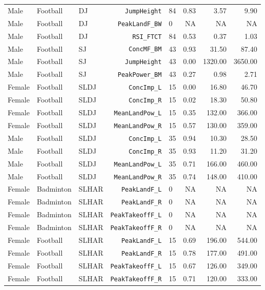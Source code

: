{\begin{longtable}{lllrlrrr}
Male & Football & DJ & \texttt{JumpHeight} & 84 & 0.83 & 3.57 & 9.90 \\
Male & Football & DJ & \texttt{PeakLandF\_BW} & 0 & NA & NA & NA \\
Male & Football & DJ & \texttt{RSI\_FTCT} & 84 & 0.53 & 0.37 & 1.03 \\
\addlinespace[1pt]
Male & Football & SJ & \texttt{ConcMF\_BM} & 43 & 0.93 & 31.50 & 87.40 \\
Male & Football & SJ & \texttt{JumpHeight} & 43 & 0.00 & 1320.00 & 3650.00 \\
Male & Football & SJ & \texttt{PeakPower\_BM} & 43 & 0.27 & 0.98 & 2.71 \\
\addlinespace[1pt]
Female & Football & SLDJ & \texttt{ConcImp\_L} & 15 & 0.00 & 16.80 & 46.70 \\
Female & Football & SLDJ & \texttt{ConcImp\_R} & 15 & 0.02 & 18.30 & 50.80 \\
Female & Football & SLDJ & \texttt{MeanLandPow\_L} & 15 & 0.35 & 132.00 & 366.00 \\
Female & Football & SLDJ & \texttt{MeanLandPow\_R} & 15 & 0.57 & 130.00 & 359.00 \\
Male & Football & SLDJ & \texttt{ConcImp\_L} & 35 & 0.94 & 10.30 & 28.50 \\
Male & Football & SLDJ & \texttt{ConcImp\_R} & 35 & 0.93 & 11.20 & 31.20 \\
Male & Football & SLDJ & \texttt{MeanLandPow\_L} & 35 & 0.71 & 166.00 & 460.00 \\
Male & Football & SLDJ & \texttt{MeanLandPow\_R} & 35 & 0.74 & 148.00 & 410.00 \\
\addlinespace[1pt]
Female & Badminton & SLHAR & \texttt{PeakLandF\_L} & 0 & NA & NA & NA \\
Female & Badminton & SLHAR & \texttt{PeakLandF\_R} & 0 & NA & NA & NA \\
Female & Badminton & SLHAR & \texttt{PeakTakeoffF\_L} & 0 & NA & NA & NA \\
Female & Badminton & SLHAR & \texttt{PeakTakeoffF\_R} & 0 & NA & NA & NA \\
Female & Football & SLHAR & \texttt{PeakLandF\_L} & 15 & 0.69 & 196.00 & 544.00 \\
Female & Football & SLHAR & \texttt{PeakLandF\_R} & 15 & 0.78 & 177.00 & 491.00 \\
Female & Football & SLHAR & \texttt{PeakTakeoffF\_L} & 15 & 0.67 & 126.00 & 349.00 \\
Female & Football & SLHAR & \texttt{PeakTakeoffF\_R} & 15 & 0.71 & 120.00 & 333.00 \\

\end{longtable}}
